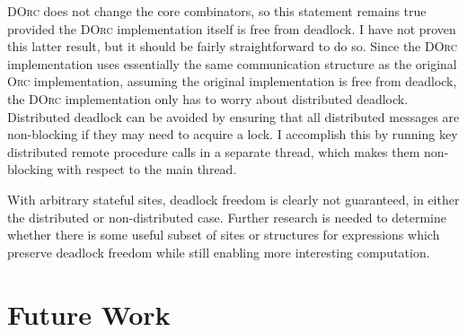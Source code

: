 \documentclass[10pt,letterpaper]{article}
\begin{document}
\textsc{DOrc} does not change the core combinators, so this statement
remains true provided the \textsc{DOrc} implementation itself is free from
deadlock. I have not proven this latter result, but it should be fairly
straightforward to do so. Since the \textsc{DOrc} implementation uses
essentially the same communication structure as the original \textsc{Orc}
implementation, assuming the original implementation is free from deadlock,
the \textsc{DOrc} implementation only has to worry about distributed deadlock.
Distributed deadlock can be avoided by ensuring that all distributed messages
are non-blocking if they may need to acquire a lock. I accomplish this by
running key distributed remote procedure calls in a separate thread, which
makes them non-blocking with respect to the main thread.

With arbitrary stateful sites, deadlock freedom is clearly not guaranteed, in
either the distributed or non-distributed case. Further research is needed to
determine whether there is some useful subset of sites or structures for
expressions which preserve deadlock freedom while still enabling more
interesting computation.

\section{Future Work}
\label{sec:conclusion}
\end{document}
